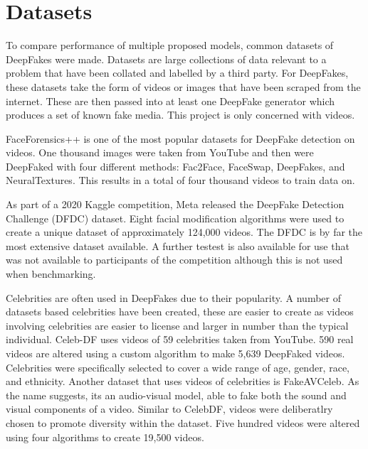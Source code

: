 \section{Datasets}
\label{sec:datasets}

To compare performance of multiple proposed models, common datasets of DeepFakes were made. Datasets are large collections of data relevant to a problem that have been collated and labelled by a third party. For DeepFakes, these datasets take the form of videos or images that have been scraped from the internet. These are then passed into at least one DeepFake generator which produces a set of known fake media. This project is only concerned with videos.

FaceForensics++\cite{roessler2018faceforensics}\cite{roessler2019faceforensicspp}\cite{dufour2019deepfakes} is one of the most popular datasets for DeepFake detection on videos. One thousand images were taken from YouTube and then were DeepFaked with four different methods: Fac2Face\cite{thies2016face2face}, FaceSwap\cite{kowalski2016faceswap}, DeepFakes\cite{deepfakes}, and NeuralTextures\cite{thies2019deferred}. This results in a total of four thousand videos to train data on. 

As part of a 2020 Kaggle competition, Meta released the DeepFake Detection Challenge (DFDC) dataset\cite{dolhansky2020deepfake}. Eight facial modification algorithms were used to create a unique dataset of approximately 124,000 videos. The DFDC is by far the most extensive dataset available. A further testest is also available for use that was not available to participants of the competition although this is not used when benchmarking.

Celebrities are often used in DeepFakes due to their popularity. A number of datasets based celebrities have been created, these are easier to create as videos involving celebrities are easier to license and larger in number than the typical individual. Celeb-DF\cite{li2020celeb} uses videos of 59 celebrities taken from YouTube. 590 real videos are altered using a custom algorithm to make 5,639 DeepFaked videos. Celebrities were specifically selected to cover a wide range of age, gender, race, and ethnicity. Another dataset that uses videos of celebrities is FakeAVCeleb\cite{khalid2021fakeavceleb}. As the name suggests, its an audio-visual model, able to fake both the sound and visual components of a video. Similar to CelebDF, videos were deliberatlry chosen to promote diversity within the dataset. Five hundred videos were altered using four algorithms to create 19,500 videos.